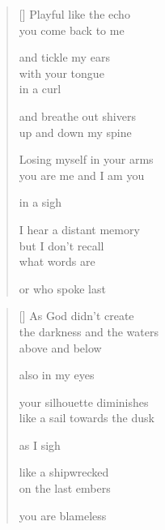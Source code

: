 \documentclass[12pt,a4paper]{article}
\begin{document}

\newpage

\poemtitle{}

\settowidth{\versewidth}{losing myself in your arms}

\bigskip

\begin{verse}[\versewidth]
  Playful like the echo \\
  you come back to me

  and tickle my ears \\
  with your tongue \\
  in a curl

  and breathe out shivers \\
  up and down my spine

  Losing myself in your arms \\
  you are me and I am you

  in a sigh

  I hear a distant memory \\
  but I don't recall \\
  what words are

  or who spoke last
\end{verse}


\newpage

\poemtitle{}

\settowidth{\versewidth}{the darkness and the waters}

\bigskip

\begin{verse}[\versewidth]
  As God didn't create \\
  the darkness and the waters \\
  above and below

  also in my eyes

  your silhouette diminishes \\
  like a sail towards the dusk

  as I sigh

  like a shipwrecked \\
  on the last embers

  you are blameless
\end{verse}

\end{document}

